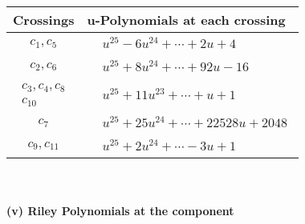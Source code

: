 \documentclass[1p]{elsarticle_modified}
\theoremstyle{definition}
\begin{document}
\begin{tabular}{m{50pt}|m{274pt}}
Crossings & \hspace{64pt}u-Polynomials at each crossing \\
\hline $$\begin{aligned}c_{1},c_{5}\end{aligned}$$&$\begin{aligned}
&u^{25}-6 u^{24}+\cdots+2 u+4
\end{aligned}$\\
\hline $$\begin{aligned}c_{2},c_{6}\end{aligned}$$&$\begin{aligned}
&u^{25}+8 u^{24}+\cdots+92 u-16
\end{aligned}$\\
\hline $$\begin{aligned}c_{3},c_{4},c_{8}\\c_{10}\end{aligned}$$&$\begin{aligned}
&u^{25}+11 u^{23}+\cdots+u+1
\end{aligned}$\\
\hline $$\begin{aligned}c_{7}\end{aligned}$$&$\begin{aligned}
&u^{25}+25 u^{24}+\cdots+22528 u+2048
\end{aligned}$\\
\hline $$\begin{aligned}c_{9},c_{11}\end{aligned}$$&$\begin{aligned}
&u^{25}+2 u^{24}+\cdots-3 u+1
\end{aligned}$\\
\hline
\end{tabular}\\~\\
\newpage\renewcommand{\arraystretch}{1}
\flushleft \textbf{(v) Riley Polynomials at the component}\newline \\
\end{document}

